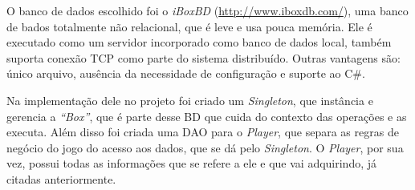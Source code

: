 O banco de dados escolhido foi o \textit{iBoxBD} (\url{http://www.iboxdb.com/}), uma banco de bados totalmente não relacional, que é leve e usa pouca memória. Ele é executado como um servidor incorporado como banco de dados local, também suporta conexão TCP como parte do sistema distribuído. Outras vantagens são: único arquivo, ausência da necessidade de configuração e suporte ao C\#.

Na implementação dele no projeto foi criado um \textit{Singleton}, que instância e gerencia a \textit{“Box”}, que é parte desse BD que cuida do contexto das operações e as executa. Além disso foi criada uma DAO para o \textit{Player}, que separa as regras de negócio do jogo do acesso aos dados, que se dá pelo \textit{Singleton}. O \textit{Player}, por sua vez, possui todas as informações que se refere a ele e que vai adquirindo, já citadas anteriormente.
